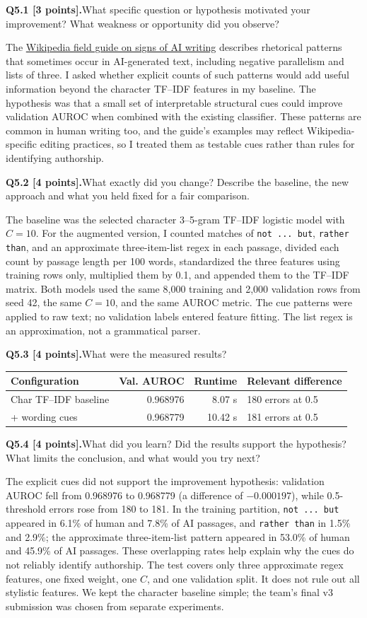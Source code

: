 \documentclass[11pt,letterpaper]{article}
\newcommand{\question}[2]{\par\vspace{6pt}\noindent\textbf{#1}\quad #2\par}
\begin{document}
\question{Q5.1 [3 points].}{What specific question or hypothesis motivated your improvement? What weakness or opportunity did you observe?}
The \href{https://en.wikipedia.org/wiki/Wikipedia:Signs_of_AI_writing}{Wikipedia field guide on signs of AI writing} describes rhetorical patterns that sometimes occur in AI-generated text, including negative parallelism and lists of three. I asked whether explicit counts of such patterns would add useful information beyond the character TF--IDF features in my baseline. The hypothesis was that a small set of interpretable structural cues could improve validation AUROC when combined with the existing classifier. These patterns are common in human writing too, and the guide's examples may reflect Wikipedia-specific editing practices, so I treated them as testable cues rather than rules for identifying authorship.
\question{Q5.2 [4 points].}{What exactly did you change? Describe the baseline, the new approach and what you held fixed for a fair comparison.}
The baseline was the selected character 3--5-gram TF--IDF logistic model with $C=10$. For the augmented version, I counted matches of \texttt{not ... but}, \texttt{rather than}, and an approximate three-item-list regex in each passage, divided each count by passage length per 100 words, standardized the three features using training rows only, multiplied them by 0.1, and appended them to the TF--IDF matrix. Both models used the same 8,000 training and 2,000 validation rows from seed 42, the same $C=10$, and the same AUROC metric. The cue patterns were applied to raw text; no validation labels entered feature fitting. The list regex is an approximation, not a grammatical parser.
\question{Q5.3 [4 points].}{What were the measured results?}
\begin{tabularx}{\linewidth}{@{}YrrY@{}}\toprule Configuration & Val. AUROC & Runtime & Relevant difference \\ \midrule Char TF--IDF baseline & 0.968976 & 8.07 s & 180 errors at 0.5 \\ + wording cues & 0.968779 & 10.42 s & 181 errors at 0.5 \\ \bottomrule\end{tabularx}
\question{Q5.4 [4 points].}{What did you learn? Did the results support the hypothesis? What limits the conclusion, and what would you try next?}
The explicit cues did not support the improvement hypothesis: validation AUROC fell from 0.968976 to 0.968779 (a difference of $-0.000197$), while 0.5-threshold errors rose from 180 to 181. In the training partition, \texttt{not ... but} appeared in 6.1\% of human and 7.8\% of AI passages, and \texttt{rather than} in 1.5\% and 2.9\%; the approximate three-item-list pattern appeared in 53.0\% of human and 45.9\% of AI passages. These overlapping rates help explain why the cues do not reliably identify authorship. The test covers only three approximate regex features, one fixed weight, one $C$, and one validation split. It does not rule out all stylistic features. We kept the character baseline simple; the team's final v3 submission was chosen from separate experiments.
\end{document}
